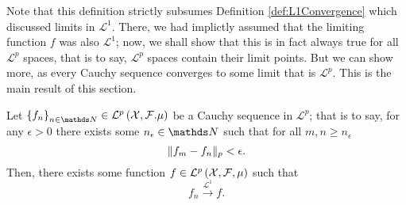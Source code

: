 Note that this definition strictly subsumes Definition \ref{def:L1Convergence}
which discussed limits in $\mathcal{L}^{1}$. There, we had implictly
assumed that the limiting function $f$ was also $\mathcal{L}^{1}$;
now, we shall show that this is in fact always true for all $\mathcal{L}^{p}$
spaces, that is to say, $\mathcal{L}^{p}$ spaces contain their limit
points. But we can show more, as every Cauchy sequence converges to
some limit that is $\mathcal{L}^{p}$. This is the main result of
this section.
\begin{thm}
\label{thm:completenessLp} Let $\left\{ f_{n}\right\} _{n\in\N}\in\mathcal{L}^{p}\left(\X,\F.\mu\right)$
be a Cauchy sequence in $\mathcal{L}^{p}$; that is to say, for any
$\epsilon>0$ there exists some $n_{\epsilon}\in\N$ such that for
all $m,n\geq n_{\epsilon}$
\[
\lVert f_{m}-f_{n}\rVert_{p}<\epsilon.
\]
Then, there exists some function $f\in\mathcal{L}^{p}\left(\mathcal{X},\mathcal{F},\mu\right)$ such that
\[
f_{n}\stackrel{\mathcal{L}^{1}}{\longrightarrow}f.
\]
\end{thm}

